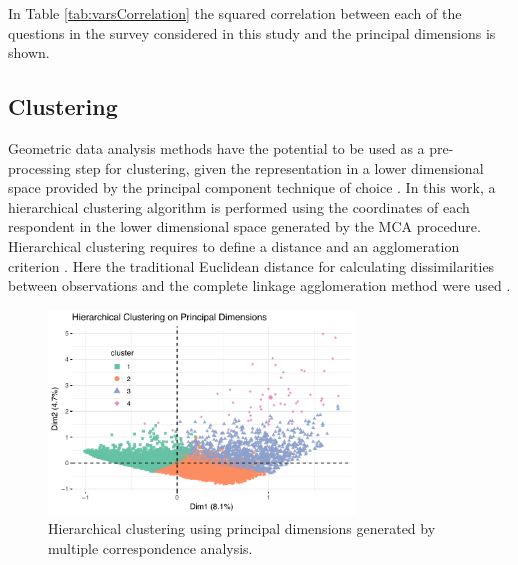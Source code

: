\documentclass[conference]{IEEEtran}
\begin{document}
In Table \ref{tab:varsCorrelation} the squared correlation between each
of the questions in the survey considered in this study and the
principal dimensions is shown.

\hypertarget{clustering}{%
\subsection{Clustering}\label{clustering}}

Geometric data analysis methods have the potential to be used as a
pre-processing step for clustering, given the representation in a lower
dimensional space provided by the principal component technique of
choice \cite{jolliffe2002principal}. In this work, a hierarchical
clustering algorithm is performed using the coordinates of each
respondent in the lower dimensional space generated by the MCA
procedure. Hierarchical clustering requires to define a distance and an
agglomeration criterion \cite{tan2013data}. Here the traditional
Euclidean distance for calculating dissimilarities between observations
and the complete linkage agglomeration method were used
\cite{ding2002cluster}.

\begin{figure}[!ht] 
\centering 
\includegraphics[width=3.2in]{../figs/new_hclust.pdf}
\caption{Hierarchical clustering using principal dimensions generated by multiple correspondence analysis.}
\label{fig:hclust} 
\end{figure}
\end{document}
